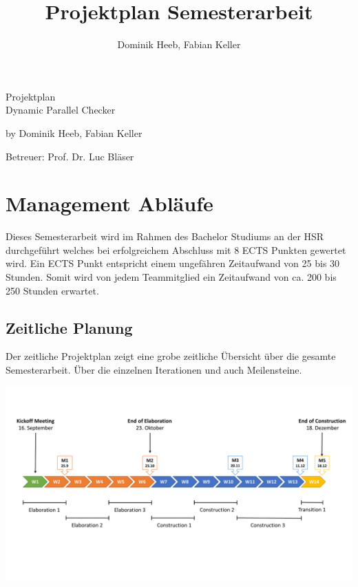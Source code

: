 \documentclass[10pt,a4paper]{article}
\author{Dominik Heeb, Fabian Keller}
\title{Projektplan Semesterarbeit}
\begin{document}
\begin{titlepage}
	\begin{Huge}
		\begin{center}
				Projektplan \\Dynamic Parallel Checker\\[2.0cm]
		\end{center}
	\end{Huge}
	
	\begin{center}
		\begin{Large}
				by Dominik Heeb, Fabian Keller\\[1.0cm]
		\end{Large}
		\begin{large}
				Betreuer: Prof. Dr. Luc Bläser
		\end{large}
	\end{center}
\end{titlepage}

\newpage
\tableofcontents 
\newpage

\section{Management Abläufe}
\begin{flushleft}
	Dieses Semesterarbeit wird im Rahmen des Bachelor Studiums an der HSR durchgeführt welches bei erfolgreichem Abschluss mit 8 ECTS Punkten gewertet wird. Ein ECTS Punkt entspricht einem ungefähren Zeitaufwand von 25 bis 30 Stunden. Somit wird von jedem Teammitglied ein Zeitaufwand von ca. 200 bis 250 Stunden erwartet.
\end{flushleft}

\subsection{Zeitliche Planung}
	\begin{flushleft}
		Der zeitliche Projektplan zeigt eine grobe zeitliche Übersicht über die gesamte Semesterarbeit. Über die einzelnen Iterationen und auch Meilensteine.
	\end{flushleft}
	\includegraphics[width=16cm,height=7.5cm,trim=10mm 40mm 0mm 20mm, clip]{pictures/Meilensteinplan.pdf}
\end{document}
